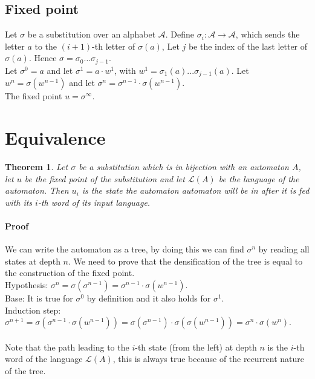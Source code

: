 \documentclass{article}
\begin{document}
\subsection{Fixed point}
Let $\sigma$ be a substitution over an alphabet $\mathcal{A}$. Define 
$\sigma_i: \mathcal{A \rightarrow A}$, which sends the letter $a$ to the 
$(i + 1)$-th letter of $\sigma(a)$, Let $j$ be the index of the last letter
of $\sigma(a)$. Hence $\sigma = \sigma_0 \ldots \sigma_{j - 1}$.\\
Let $\sigma^0 = a$ and let $\sigma^1 = a \cdot w^1$, with 
$w^1 = \sigma_1(a) ... \sigma_{j - 1}(a)$. Let $w^n = \sigma(w^{n - 1})$ and 
let $\sigma^n = \sigma^{n - 1} \cdot \sigma(w^{n - 1})$.\\
The fixed point $u = \sigma^\infty$.

\section{Equivalence}
\newtheorem{automata}{Theorem} \begin{automata} \label{aiss}
Let $\sigma$ be a substitution which is in bijection with an automaton
$A$, let $u$ be the fixed point of the substitution and let 
$\mathcal{L}(A)$ be the language of the automaton. Then $u_i$ is the state 
the automaton automaton will be in after it is fed with its $i$-th word of 
its input language.
\end{automata}
\paragraph{Proof}
We can write the automaton as a tree, by doing this we can find $\sigma^n$ by
reading all states at depth $n$. We need to prove that the densification of
the tree is equal to the construction of the fixed point.\\
Hypothesis: 
$\sigma^n = \sigma(\sigma^{n - 1}) = \sigma^{n - 1} \cdot \sigma(w^{n - 1})$.\\
Base: It is true for $\sigma^0$ by definition and it also holds for 
$\sigma^1$.\\
Induction step: 
$\sigma^{n + 1} = \sigma(\sigma^{n - 1} \cdot \sigma(w^{n - 1})) =
\sigma(\sigma^{n - 1}) \cdot \sigma(\sigma(w^{n - 1})) =
\sigma^n \cdot \sigma(w^n)$.\\
\\
Note that the path leading to the $i$-th state (from the left) at depth $n$ 
is the $i$-th word of the language $\mathcal{L}(A)$, this is always true 
because of the recurrent nature of the tree.
\end{document}
